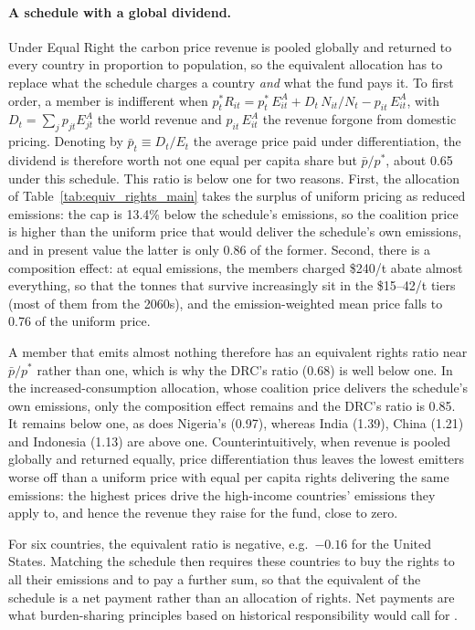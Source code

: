\documentclass[12pt,english]{article}
\theoremstyle{remark}
\begin{document}
\paragraph{A schedule with a global dividend.} Under Equal Right the carbon price revenue is pooled globally and returned to every country in proportion to population, so the equivalent allocation has to replace what the schedule charges a country \emph{and} what the fund pays it. To first order, a member is indifferent when $p^*_t R_{it} = p^*_t\,E^A_{it} + D_t\,N_{it}/N_t - p_{it}\,E^A_{it}$, with $D_t=\sum_j p_{jt}E^A_{jt}$ the world revenue and $p_{it}\,E^A_{it}$ the revenue forgone from domestic pricing.
Denoting by $\bar p_t \equiv D_t/E_t$ the average price paid under differentiation, the dividend is therefore worth not one equal per capita share but $\bar p/p^*$, about 0.65 under this schedule. This ratio is below one for two reasons. First, the allocation of Table~\ref{tab:equiv_rights_main} takes the surplus of uniform pricing as reduced emissions: the cap is 13.4\% below the schedule's emissions, so the coalition price is higher than the uniform price that would deliver the schedule's own emissions,
and in present value the latter is only 0.86 of the former. Second, there is a composition effect: at equal emissions, the members charged \$240/t abate almost everything, so that the tonnes that survive increasingly sit in the \$15--42/t tiers (most of them from the 2060s), and the emission-weighted mean price falls to 0.76 of the uniform price.

A member that emits almost nothing therefore has an equivalent rights ratio near $\bar p/p^*$ rather than one, which is why the DRC's ratio (0.68) is well below one. In the increased-consumption allocation, whose coalition price delivers the schedule's own emissions, only the composition effect remains and the DRC's ratio is 0.85. It remains below one, as does Nigeria's (0.97), whereas India (1.39), China (1.21) and Indonesia (1.13) are above one.
Counterintuitively, when revenue is pooled globally and returned equally, price differentiation thus leaves the lowest emitters worse off than a uniform price with equal per capita rights delivering the same emissions: the highest prices drive the high-income countries' emissions they apply to, and hence the revenue they raise for the fund, close to zero.

For six countries, the equivalent ratio is negative, e.g.\ $-0.16$ for the United States.
Matching the schedule then requires these countries to buy the rights to all their emissions and to pay a further sum, so that the equivalent of the schedule is a net payment rather than an allocation of rights. Net payments are what burden-sharing principles based on historical responsibility would call for \citep{fanning_compensation_2023}.
\end{document}
